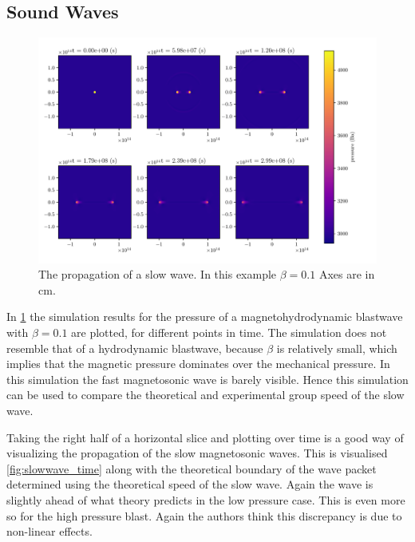 \documentclass[a4paper]{article}
\numberwithin{figure}{section}
\numberwithin{equation}{section}
\begin{document}
\subsection{Sound Waves}
\begin{figure}[H]
	\centering
	\includegraphics[width=\textwidth]{figures/slow_wave.pdf}
	\caption{The propagation of a slow wave. In this example $\beta = 0.1$ Axes are in \si{cm}.}
	\label{fig:Alfven_wave}
\end{figure}


In \cref{fig:Alfven_wave} the simulation results for the pressure of a magnetohydrodynamic blastwave with $\beta = 0.1$ are plotted, for different points in time. 
The simulation does not resemble that of a hydrodynamic blastwave, because $\beta$ is relatively small, which implies that the magnetic pressure dominates over the mechanical pressure.
In this simulation the fast magnetosonic wave is barely visible. Hence this simulation can be used to compare the theoretical and 
experimental group speed of the slow wave.

Taking the right half of a horizontal slice and plotting over time is a good way of visualizing the propagation of the slow magnetosonic waves. This is visualised \cref{fig:slowwave_time} along with the theoretical boundary of the wave packet determined using the theoretical speed of the slow wave.  
Again the wave is slightly ahead of what theory predicts in the low pressure case. This is even more so for the high pressure blast. Again the authors think this discrepancy is due to non-linear effects.
\end{document}

